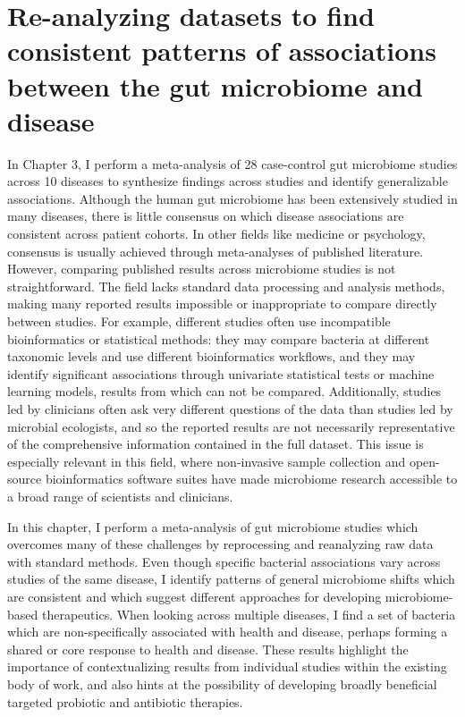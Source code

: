\section{Re-analyzing datasets to find consistent patterns of associations between the gut microbiome and disease}

In Chapter 3, I perform a meta-analysis of 28 case-control gut microbiome studies across 10 diseases to synthesize findings across studies and identify generalizable associations.
Although the human gut microbiome has been extensively studied in many diseases, there is little consensus on which disease associations are consistent across patient cohorts.
In other fields like medicine or psychology, consensus is usually achieved through meta-analyses of published literature.
However, comparing published results across microbiome studies is not straightforward.
The field lacks standard data processing and analysis methods, making many reported results impossible or inappropriate to compare directly between studies.
For example, different studies often use incompatible bioinformatics or statistical methods: they may compare bacteria at different taxonomic levels and use different bioinformatics workflows, and they may identify significant associations through univariate statistical tests or machine learning models, results from which can not be compared.
Additionally, studies led by clinicians often ask very different questions of the data than studies led by microbial ecologists, and so the reported results are not necessarily representative of the comprehensive information contained in the full dataset.
This issue is especially relevant in this field, where non-invasive sample collection and open-source bioinformatics software suites have made microbiome research accessible to a broad range of scientists and clinicians.

In this chapter, I perform a meta-analysis of gut microbiome studies which overcomes many of these challenges by reprocessing and reanalyzing raw data with standard methods.
Even though specific bacterial associations vary across studies of the same disease, I identify patterns of general microbiome shifts which are consistent  and which suggest different approaches for developing microbiome-based therapeutics.
When looking across multiple diseases, I find a set of bacteria which are non-specifically associated with health and disease, perhaps forming a shared or core response to health and disease.
These results highlight the importance of contextualizing results from individual studies within the existing body of work, and also hints at the possibility of developing broadly beneficial targeted probiotic and antibiotic therapies.

